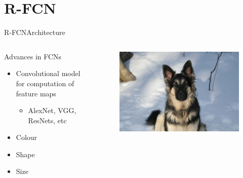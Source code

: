 \section{R-FCN}
\begin{frame}{R-FCN}{Architecture}
\begin{columns}
        \begin{block}{Advances in FCNs}
        \begin{itemize}
            \item Convolutional model for computation of feature maps
            \begin{itemize}
                \item AlexNet, VGG, ResNets, etc
            \end{itemize}
            \item Colour
            \item Shape
            \item Size
        \end{itemize}
    \end{block}
        \begin{figure}
            \includegraphics[width=1.0 \textwidth]{figs/germanshepherd.jpeg}
        \end{figure}
    \end{columns}
\end{frame}